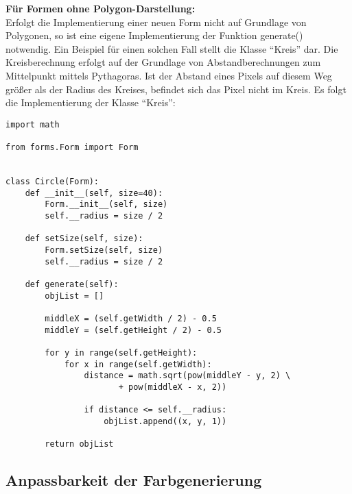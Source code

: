 \newpage

\textbf{Für Formen ohne Polygon-Darstellung:}\\

Erfolgt die Implementierung einer neuen Form nicht auf Grundlage von Polygonen, so ist eine eigene Implementierung der Funktion generate() notwendig. Ein Beispiel für einen solchen Fall stellt die Klasse "`Kreis"' dar. Die Kreisberechnung erfolgt auf der Grundlage von Abstandberechnungen zum Mittelpunkt mittels Pythagoras. Ist der Abstand eines Pixels auf diesem Weg größer als der Radius des Kreises, befindet sich das Pixel nicht im Kreis. Es folgt die Implementierung der Klasse "`Kreis"': 

\begin{lstlisting}
import math

from forms.Form import Form


class Circle(Form):
    def __init__(self, size=40):
        Form.__init__(self, size)
        self.__radius = size / 2

    def setSize(self, size):
        Form.setSize(self, size)
        self.__radius = size / 2

    def generate(self):
        objList = []

        middleX = (self.getWidth / 2) - 0.5
        middleY = (self.getHeight / 2) - 0.5

        for y in range(self.getHeight):
            for x in range(self.getWidth):
                distance = math.sqrt(pow(middleY - y, 2) \
			           + pow(middleX - x, 2))

                if distance <= self.__radius:
                    objList.append((x, y, 1))

        return objList
\end{lstlisting}

\newpage

\subsection{Anpassbarkeit der Farbgenerierung}

\newpage